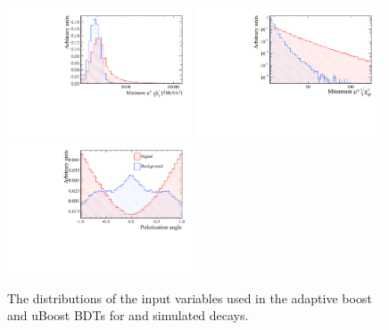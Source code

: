 \begin{figure}[htbp]
    \includegraphics[width=0.49\textwidth]{./Figs/Appendix2/min_mu_PT.pdf}
    \includegraphics[width=0.49\textwidth]{./Figs/Appendix2/min_mu_IP.pdf}
    \includegraphics[width=0.49\textwidth]{./Figs/Appendix2/polerization.pdf}
  \caption{The distributions of the input variables used in the adaptive boost and uBoost BDTs for \bsmumu and  simulated decays.}
  \label{fig:myBDTvars}
\end{figure}


